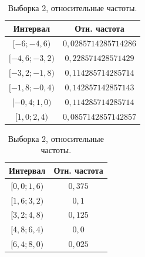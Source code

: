 \begin{table}[h]
  \begin{minipage}[h]{0.49\linewidth}
    \caption{Выборка 1, относительные частоты.}\label{tab:3}
  \end{minipage}
  \begin{minipage}[h]{0.49\linewidth}
    \caption{Выборка 2, относительные частоты.}\label{tab:4}
  \end{minipage}
  \begin{minipage}[t]{0.49\linewidth}
  \begin{center}
    \begin{tabular}{|c|c|}
      \hline
      Интервал & Отн. частота \\
      \hline 
      
        $[-6; -4{,}6)$ & $0{,}0285714285714286$ \\
        \hline
      
        $[-4{,}6; -3{,}2)$ & $0{,}228571428571429$ \\
        \hline
      
        $[-3{,}2; -1{,}8)$ & $0{,}114285714285714$ \\
        \hline
      
        $[-1{,}8; -0{,}4)$ & $0{,}142857142857143$ \\
        \hline
      
        $[-0{,}4; 1{,}0)$ & $0{,}114285714285714$ \\
        \hline
      
        $[1{,}0; 2{,}4)$ & $0{,}0857142857142857$ \\
        \hline
      
    \end{tabular}
  \end{center}
\end{minipage}
  \hfill
  \begin{minipage}[t]{0.49\linewidth}
    \begin{center}
      \begin{tabular}{|c|c|}
        \hline
        Интервал & Отн. частота \\
        \hline 
        
          $[0{,}0; 1{,}6)$ & $0{,}375$ \\
          \hline
        
          $[1{,}6; 3{,}2)$ & $0{,}1$ \\
          \hline
        
          $[3{,}2; 4{,}8)$ & $0{,}125$ \\
          \hline
        
          $[4{,}8; 6{,}4)$ & $0{,}0$ \\
          \hline
        
          $[6{,}4; 8{,}0)$ & $0{,}025$ \\
          \hline
        
      \end{tabular}
    \end{center}
  \end{minipage}
\end{table}

